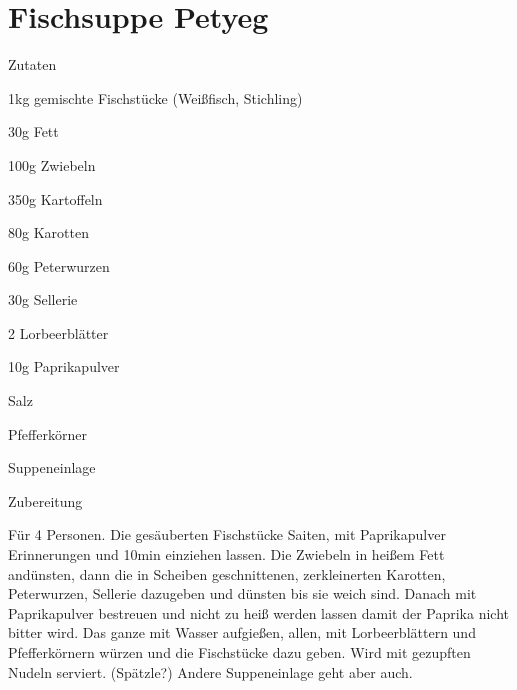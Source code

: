 \chapter*{Fischsuppe Petyeg}
\begin{multicols}{2}
 {\Large Zutaten}
 \begin{Zutaten}
		\item 1kg gemischte Fischstücke (Weißfisch,
		Stichling)
		\item 30g Fett
		\item 100g Zwiebeln
		\item 350g Kartoffeln
		\item 80g Karotten
		\item 60g Peterwurzen
		\item 30g Sellerie
		\item 2 Lorbeerblätter
		\item 10g Paprikapulver
		\item Salz
		\item Pfefferkörner
		\item Suppeneinlage
		
		
		
\end{Zutaten}
	
\columnbreak
\end{multicols}

{\Large Zubereitung} \newline
\begin{addmargin}[1cm]{0cm}
	Für 4 Personen.
	Die gesäuberten Fischstücke Saiten, mit Paprikapulver Erinnerungen und 10min einziehen lassen.\newline
	Die Zwiebeln in heißem Fett andünsten, dann die in Scheiben geschnittenen, zerkleinerten Karotten,
	Peterwurzen, Sellerie dazugeben und dünsten bis sie weich sind.\newline
	Danach mit Paprikapulver bestreuen und nicht zu heiß werden lassen damit der Paprika nicht bitter
	wird.\newline
	Das ganze mit Wasser aufgießen, allen, mit Lorbeerblättern und Pfefferkörnern würzen und die
	Fischstücke dazu geben.\newline
	Wird mit gezupften Nudeln serviert. (Spätzle?)\newline
	Andere Suppeneinlage geht aber auch.
	
	
\end{addmargin}
